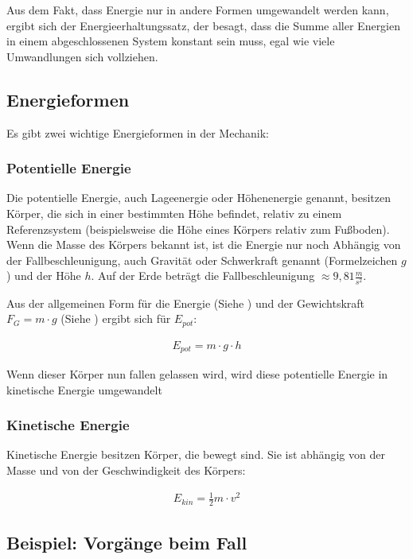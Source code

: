 Aus dem Fakt, dass Energie nur in andere Formen umgewandelt werden kann, ergibt sich der Energieerhaltungssatz, der besagt, dass die Summe aller Energien in einem abgeschlossenen System konstant sein muss, egal wie viele Umwandlungen sich vollziehen. 


\subsection{Energieformen}

Es gibt zwei wichtige Energieformen in der Mechanik:

\subsubsection{Potentielle Energie}

Die potentielle Energie, auch Lageenergie oder Höhenenergie genannt, besitzen Körper, die sich in einer bestimmten Höhe befindet, relativ zu einem Referenzsystem (beispielsweise die Höhe eines Körpers relativ zum Fußboden). Wenn die Masse des Körpers bekannt ist, ist die Energie nur noch Abhängig von der Fallbeschleunigung, auch Gravität oder Schwerkraft genannt (Formelzeichen $g$) und der Höhe $h$. Auf der Erde beträgt die Fallbeschleunigung $\approx 9,81 \frac{m}{s^2}$.

Aus der allgemeinen Form für die Energie (Siehe ) und der Gewichtskraft $F_G = m \cdot g$ (Siehe ) ergibt sich für $E_{pot}$:

\begin{align} \label{eq:epot}
	E_{pot} = m \cdot g \cdot h
\end{align}

\noindent Wenn dieser Körper nun fallen gelassen wird, wird diese potentielle Energie in kinetische Energie umgewandelt

\subsubsection{Kinetische Energie}

Kinetische Energie besitzen Körper, die bewegt sind. Sie ist abhängig von der Masse und von der Geschwindigkeit des Körpers:

\begin{align} \label{eq:ekin}
	E_{kin} = \frac{1}{2} m \cdot v^2
\end{align}



\subsection{Beispiel: Vorgänge beim Fall}

